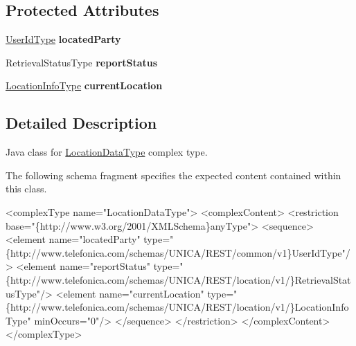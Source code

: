 \subsection*{Protected Attributes}
\begin{DoxyCompactItemize}
\item 
\hypertarget{classcom_1_1telefonica_1_1schemas_1_1unica_1_1rest_1_1location_1_1v1_1_1LocationDataType_aded987d6357a1425335af4c4dde9fd99}{
\hyperlink{classcom_1_1telefonica_1_1schemas_1_1unica_1_1rest_1_1common_1_1v1_1_1UserIdType}{UserIdType} {\bfseries locatedParty}}
\label{classcom_1_1telefonica_1_1schemas_1_1unica_1_1rest_1_1location_1_1v1_1_1LocationDataType_aded987d6357a1425335af4c4dde9fd99}

\item 
\hypertarget{classcom_1_1telefonica_1_1schemas_1_1unica_1_1rest_1_1location_1_1v1_1_1LocationDataType_a4dd285e65fd95046a018abf1e55a214c}{
RetrievalStatusType {\bfseries reportStatus}}
\label{classcom_1_1telefonica_1_1schemas_1_1unica_1_1rest_1_1location_1_1v1_1_1LocationDataType_a4dd285e65fd95046a018abf1e55a214c}

\item 
\hypertarget{classcom_1_1telefonica_1_1schemas_1_1unica_1_1rest_1_1location_1_1v1_1_1LocationDataType_a9e8738f28e646cdaf3c44a8a340de3de}{
\hyperlink{classcom_1_1telefonica_1_1schemas_1_1unica_1_1rest_1_1location_1_1v1_1_1LocationInfoType}{LocationInfoType} {\bfseries currentLocation}}
\label{classcom_1_1telefonica_1_1schemas_1_1unica_1_1rest_1_1location_1_1v1_1_1LocationDataType_a9e8738f28e646cdaf3c44a8a340de3de}

\end{DoxyCompactItemize}


\subsection{Detailed Description}
Java class for \hyperlink{classcom_1_1telefonica_1_1schemas_1_1unica_1_1rest_1_1location_1_1v1_1_1LocationDataType}{LocationDataType} complex type.

The following schema fragment specifies the expected content contained within this class.


\begin{DoxyPre}
 <complexType name="LocationDataType">
   <complexContent>
     <restriction base="\{http://www.w3.org/2001/XMLSchema\}anyType">
       <sequence>
         <element name="locatedParty" type="\{http://www.telefonica.com/schemas/UNICA/REST/common/v1\}UserIdType"/>
         <element name="reportStatus" type="\{http://www.telefonica.com/schemas/UNICA/REST/location/v1/\}RetrievalStatusType"/>
         <element name="currentLocation" type="\{http://www.telefonica.com/schemas/UNICA/REST/location/v1/\}LocationInfoType" minOccurs="0"/>
       </sequence>
     </restriction>
   </complexContent>
 </complexType>
 \end{DoxyPre}
 

